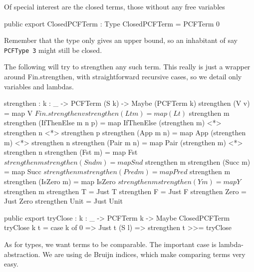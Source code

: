 Of special interest are the closed terms, those without any free variables

\begin{code}
public export
ClosedPCFTerm : Type
ClosedPCFTerm = PCFTerm 0
\end{code}

Remember that the type only gives an upper bound, so an inhabitant of say
\lstinline{PCFType 3} might still be closed.

The following will try to strengthen any such term. This really is just a
wrapper around Fin.strengthen, with straightforward recursive cases,
so we detail only variables and lambdas.   %

\begin{code}
strengthen : {k : _} -> PCFTerm (S k) -> Maybe (PCFTerm k)
strengthen (V v)              = map V          $ Fin.strengthen v
strengthen (L t m)            = map (L t)      $ strengthen m
strengthen (IfThenElse m n p) = map IfThenElse (strengthen m) <*> strengthen n <*> strengthen p
strengthen (App m n)          = map App        (strengthen m) <*> strengthen n
strengthen (Pair m n)         = map Pair       (strengthen m) <*> strengthen n
strengthen (Fst m)            = map Fst        $ strengthen m
strengthen (Snd m)            = map Snd        $ strengthen m
strengthen (Succ m)           = map Succ       $ strengthen m
strengthen (Pred m)           = map Pred       $ strengthen m
strengthen (IsZero m)         = map IsZero     $ strengthen m
strengthen (Y m)              = map Y          $ strengthen m
strengthen T                  = Just T
strengthen F                  = Just F
strengthen Zero               = Just Zero
strengthen Unit       = Just Unit
\end{code}

\begin{code}
public export
tryClose : {k : _} -> PCFTerm k -> Maybe ClosedPCFTerm
tryClose {k} t = case k of
                 0      => Just t
                 (S l) => strengthen t >>= tryClose
\end{code}

As for types, we want terms to be comparable. The important case is
lambda-abstraction. We are using de Bruijn indices, which make comparing terms
very easy.

